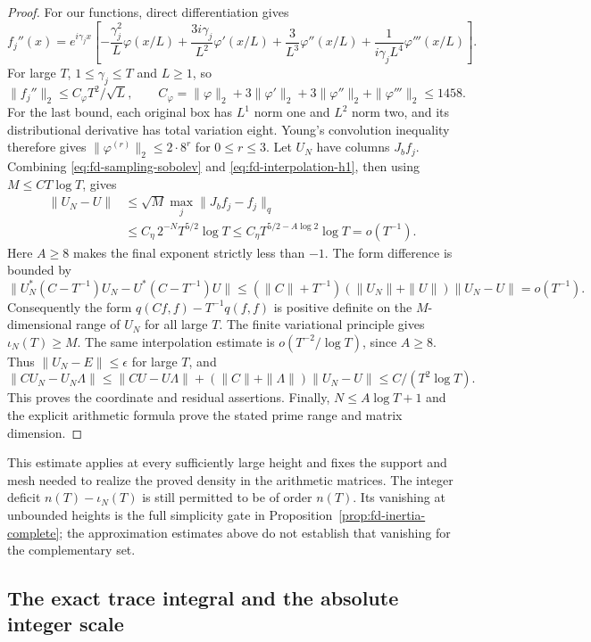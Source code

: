 \begin{proof}
For our functions, direct differentiation gives
\[
 f_j''(x)=e^{i\gamma_jx}
 \left[-\frac{\gamma_j^2}{L}\varphi(x/L)
       +\frac{3i\gamma_j}{L^2}\varphi'(x/L)
       +\frac3{L^3}\varphi''(x/L)
       +\frac1{i\gamma_jL^4}\varphi'''(x/L)\right].
\]
For large \(T\), \(1\le\gamma_j\le T\) and \(L\ge1\),
so
\[
 \|f_j''\|_2\le C_\varphi T^2/\sqrt L,\qquad
 C_\varphi=\|\varphi\|_2+3\|\varphi'\|_2+
             3\|\varphi''\|_2+\|\varphi'''\|_2\le1458.
\]
For the last bound, each original box has \(L^1\) norm one and
\(L^2\) norm two, and its distributional derivative has total
variation eight. Young's convolution inequality therefore gives
\(\|\varphi^{(r)}\|_2\le2\cdot8^r\) for \(0\le r\le3\).
Let \(U_N\) have columns \(J_bf_j\). Combining
\eqref{eq:fd-sampling-sobolev} and
\eqref{eq:fd-interpolation-h1}, then using
\(M\le C T\log T\), gives
\begin{align*}
 \|U_N-U\|
 &\le\sqrt M\max_j\|J_bf_j-f_j\|_q\\
 &\le C_\eta\,2^{-N}T^{5/2}\log T
 \le C_\eta T^{5/2-A\log2}\log T=o(T^{-1}).
\end{align*}
Here \(A\ge8\) makes the final exponent strictly less than
\(-1\). The form difference is bounded by
\[
 \|U_N^*(C-T^{-1})U_N-U^*(C-T^{-1})U\|
 \le(\|C\|+T^{-1})
       (\|U_N\|+\|U\|)\|U_N-U\|=o(T^{-1}).
\]
Consequently the form \(q(Cf,f)-T^{-1}q(f,f)\) is positive
definite on the \(M\)-dimensional range of \(U_N\) for all large
\(T\). The finite variational principle gives
\(\iota_N(T)\ge M\). The same interpolation estimate is
\(o(T^{-2}/\log T)\), since \(A\ge8\). Thus
\(\|U_N-E\|\le\epsilon\) for large \(T\), and
\[
 \|CU_N-U_N\Lambda\|
 \le\|CU-U\Lambda\|+(\|C\|+\|\Lambda\|)\|U_N-U\|
 \le C/(T^2\log T).
\]
This proves the coordinate and residual assertions. Finally, \(N\le A\log T+1\) and the explicit arithmetic formula
prove the stated prime range and matrix dimension.
\end{proof}

This estimate applies at every sufficiently large height and fixes
the support and mesh needed to realize the proved density in the
arithmetic matrices. The integer deficit
\(n(T)-\iota_N(T)\) is still permitted to be of order \(n(T)\).
Its vanishing at unbounded heights is the full simplicity gate in
Proposition~\ref{prop:fd-inertia-complete}; the approximation estimates
above do not establish that vanishing for the complementary set.

\subsection{The exact trace integral and the absolute integer scale}

